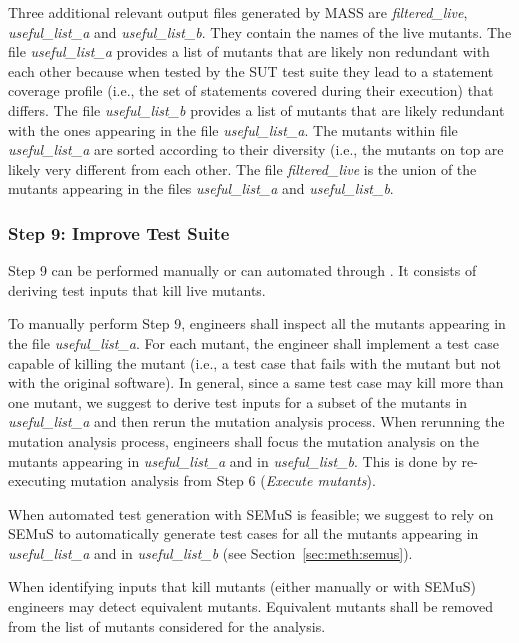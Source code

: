 {Three additional relevant output files generated by MASS are \emph{filtered\_live}, \emph{useful\_list\_a} and \emph{useful\_list\_b}. They contain the names of the live mutants.
The file \emph{useful\_list\_a} provides a list of mutants that are likely non redundant with each other because when tested by the SUT test suite they lead to a statement coverage profile (i.e., the set of statements covered during their execution) that differs.
The file \emph{useful\_list\_b} provides a list of mutants that are likely redundant with the ones appearing in the file \emph{useful\_list\_a}.
The mutants within file \emph{useful\_list\_a} are sorted according to their diversity (i.e., the mutants on top are likely very different from each other.
The file \emph{filtered\_live} is the union of the mutants appearing in the files
\emph{useful\_list\_a} and \emph{useful\_list\_b}.

\subsubsection{Step 9: Improve Test Suite}

Step 9 can be performed manually or can automated through \SEMUS.
It consists of deriving test inputs that kill live mutants.

To manually perform Step 9, engineers shall inspect all the mutants appearing in the file \emph{useful\_list\_a}. For each mutant, the engineer shall implement a test case capable of killing the mutant (i.e., a test case that fails with the mutant but not with the original software).
In general, since a same test case may kill more than one mutant, we suggest to derive test inputs for a subset of the mutants in \emph{useful\_list\_a} and then rerun the mutation analysis process. When rerunning the mutation analysis process, engineers shall focus the mutation analysis on the mutants appearing in \emph{useful\_list\_a} and in \emph{useful\_list\_b}. This is done by re-executing mutation analysis from Step 6 (\emph{Execute mutants}).

When automated test generation with SEMuS is feasible; we suggest to rely on SEMuS to automatically generate test cases for all the mutants appearing in \emph{useful\_list\_a} and in \emph{useful\_list\_b} (see Section~\ref{sec:meth:semus}).

When identifying inputs that kill mutants (either manually or with SEMuS) engineers may detect equivalent mutants. Equivalent mutants shall be removed from the list of mutants considered for the analysis.

}
